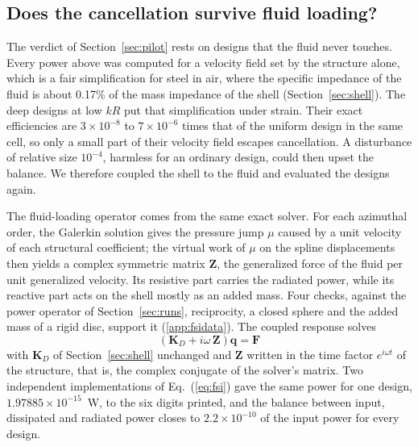 \documentclass[preprint,12pt]{elsarticle}
\begin{document}
\subsection{Does the cancellation survive fluid loading?}
\label{sec:fsi}
The verdict of Section~\ref{sec:pilot} rests on designs that the fluid never touches. Every power above was computed for a velocity field set by the structure alone, which is a fair simplification for steel in air, where the specific impedance of the fluid is about 0.17\% of the mass impedance of the shell (Section~\ref{sec:shell}). The deep designs at low $kR$ put that simplification under strain. Their exact efficiencies are $3\times10^{-8}$ to $7\times10^{-6}$ times that of the uniform design in the same cell, so only a small part of their velocity field escapes cancellation. A disturbance of relative size $10^{-4}$, harmless for an ordinary design, could then upset the balance. We therefore coupled the shell to the fluid and evaluated the designs again. %

The fluid-loading operator comes from the same exact solver. For each azimuthal order, the Galerkin solution gives the pressure jump $\mu$ caused by a unit velocity of each structural coefficient; the virtual work of $\mu$ on the spline displacements then yields a complex symmetric matrix $\mathbf Z$, the generalized force of the fluid per unit generalized velocity. Its resistive part carries the radiated power, while its reactive part acts on the shell mostly as an added mass. Four checks, against the power operator of Section~\ref{sec:runs}, reciprocity, a closed sphere and the added mass of a rigid disc, support it (\ref{app:fsidata}). The coupled response solves
\begin{equation}
  \left(\mathbf K_D+i\omega\,\mathbf Z\right)\mathbf q=\mathbf F
  \label{eq:fsi}
\end{equation}
with $\mathbf K_D$ of Section~\ref{sec:shell} unchanged and $\mathbf Z$ written in the time factor $e^{i\omega t}$ of the structure, that is, the complex conjugate of the solver's matrix. Two independent implementations of Eq.~(\ref{eq:fsi}) gave the same power for one design, $1.97885\times10^{-15}$~W, to the six digits printed, and the balance between input, dissipated and radiated power closes to $2.2\times10^{-10}$ of the input power for every design. %
\end{document}
